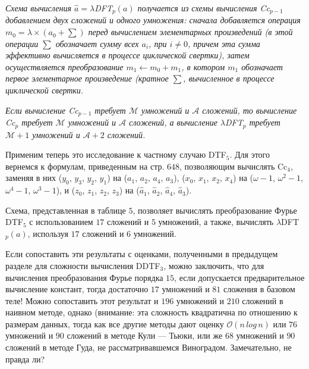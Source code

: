 \documentclass{mai_book}
\begin{document}
\textit{Схема вычисления $\hat{a} = \lambda$DFT$_p(a)$ получается из схемы вычисления Cc$_{p-1}$ добавлением двух сложений и одного умножения: сначала добавляется операция $m_0 = \lambda \times (a_0 + \sum)$ перед вычислением элементарных произведений (в этой операции $\sum$ обозначает сумму всех $a_i$, при $i \neq 0$, причем эта сумма эффективно вычисляется в процессе циклической свертки), затем осуществляется преобразование $m_1 \leftarrow m_0 + m_1$, в котором $m_1$ обозначает первое элементарное произведение (кратное $\sum$, вычисленное в процессе циклической свертки.} \par
\textit{Если вычисление Cc$_{p-1}$ требует $\mathcal{M}$ умножений и $\mathcal{A}$ сложений, то вычисление Cc$_p$ требует $\mathcal{M}$ умножений и $\mathcal{A}$ сложений, а вычисление $\lambda$DFT$_{p}$ требует $\mathcal{M}+1$ умножений и $\mathcal{A}+2$ сложений.} \par
Применим теперь это исследование к частному случаю DTF$_5$. Для этого вернемся к формулам, приведенным на стр. $648$, позволяющим  вычислять Cc$_4$, заменяя в них ($y_0$, $y_3$, $y_2$, $y_1$) на ($a_1$, $a_2$, $a_4$, $a_3$), ($x_0$, $x_1$, $x_2$, $x_4$) на ($\omega - 1$, ${\omega}^2 - 1$, ${\omega}^4 - 1$, ${\omega}^3 - 1$), и ($z_0$, $z_1$, $z_2$, $z_3$) на ($\hat{a}_1$, $\hat{a}_2$, $\hat{a}_4$, $\hat{a}_3$). \par
Схема, представленная в таблице $5$, позволяет вычислять  преобразование Фурье DTF$_5$ с использованием $17$ сложений и $5$ умножений, а также, вычислять $\lambda$DFT$_p(a)$, используя $17$ сложений и $6$ умножений. \par
Если сопоставить эти результаты с оценками, полученными в предыдущем разделе для сложности вычисления DDTF$_3$, можно заключить, что для вычисления преобразования Фурье порядка $15$, если  допускается предварительное вычисление констант, тогда достаточно $17$ умножений и $81$ сложения в базовом теле! Можно сопоставить этот результат и $196$ умножений и $210$ сложений в наивном методе, однако (внимание: эта сложность квадратична по отношению к размерам данных, тогда как все другие методы дают оценку $\mathcal{O}(n\,log\,n)$ или $76$ умножений и $90$ сложений в методе Кули --- Тьюки, или же $68$ умножений и $90$  сложений в методе Гуда, не рассматривавшемся Виноградом. Замечательно, не правда ли?
\end{document}
